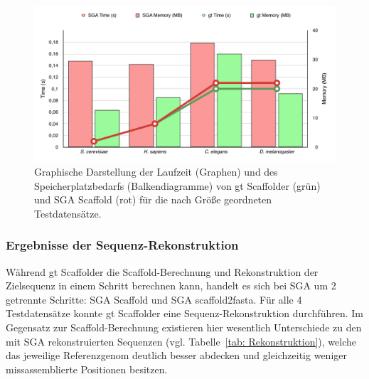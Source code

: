 \documentclass[a4paper,11pt,parskip]{scrartcl}
\begin{document}
\begin{figure}[t]
  \includegraphics[width=\textwidth,height=0.8\textheight,keepaspectratio]{presentation/figures/sga_vs_gt.pdf}
  \caption{\label{abb: Zeit}Graphische Darstellung der Laufzeit (Graphen) und
  des Speicherplatzbedarfs (Balkendiagramme) von gt Scaffolder (grün) und SGA
  Scaffold (rot) für die nach Größe geordneten Testdatensätze. }
\end{figure}


\subsubsection*{Ergebnisse der Sequenz-Rekonstruktion}
Während gt Scaffolder die Scaffold-Berechnung und Rekonstruktion der Zielsequenz
in einem Schritt berechnen kann, handelt es sich bei SGA um 2 getrennte
Schritte: SGA Scaffold und SGA scaffold2fasta. Für alle 4 Testdatensätze konnte
gt Scaffolder eine Sequenz-Rekonstruktion durchführen. Im Gegensatz zur
Scaffold-Berechnung existieren hier wesentlich Unterschiede zu den mit SGA
rekonstruierten Sequenzen (vgl. Tabelle~\ref{tab: Rekonstruktion}), welche das
jeweilige Referenzgenom deutlich besser abdecken und gleichzeitig weniger
missassemblierte Positionen besitzen.
\end{document}

